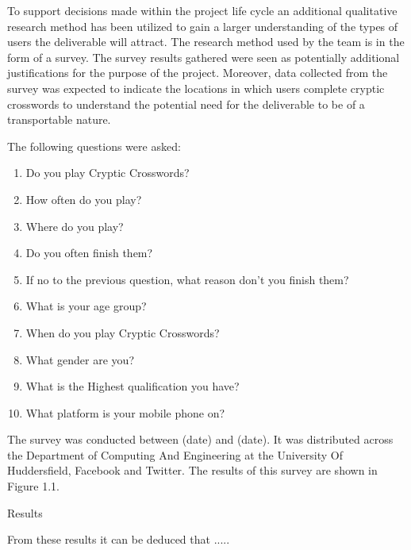 To support decisions made within the project life cycle an additional qualitative 
research method has  been utilized to gain a larger understanding of the
 types of users the deliverable will attract. The research method used by the
 team is in the form of a survey. The survey results gathered were seen as 
potentially additional justifications for the purpose of the project. Moreover, 
data collected from the survey was expected to indicate the locations in which
 users complete cryptic crosswords to understand the potential need for the deliverable
 to be of a transportable nature. 

The following questions were asked:
\begin{enumerate}
\item Do you play Cryptic Crosswords?
\item How often do you play?
\item Where do you play?
\item Do you often finish them?
\item If no to the previous question, what reason don't you finish them?
\item What is your age group?
\item When do you play Cryptic Crosswords?
\item What gender are you?
\item What is the Highest qualification you have?
\item What platform is your mobile phone on?
\end{enumerate}

The survey was conducted between (date) and (date). It was distributed across the Department
of Computing And Engineering at the University Of Huddersfield, Facebook and Twitter. The
results of this survey are shown in Figure 1.1.

Results

From these results it can be deduced that .....

